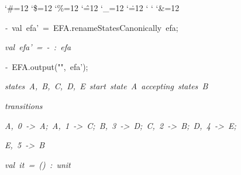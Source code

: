 \begin{list}{}
{\setlength{\leftmargin}{\leftmargini}
\setlength{\rightmargin}{0cm}
\setlength{\itemindent}{0cm}
\setlength{\listparindent}{0cm}
\setlength{\itemsep}{0cm}
\setlength{\parsep}{0cm}
\setlength{\labelsep}{0cm}
\setlength{\labelwidth}{0cm}
\catcode`\#=12
\catcode`\$=12
\catcode`\%=12
\catcode`\^=12
\catcode`\_=12
\catcode`\.=12
\catcode`
\catcode`
\catcode`\&=12
\ttfamily}
\small
\item[]\textsl{-\ }val\ efa'\ =\ EFA.renameStatesCanonically\ efa;
\item[]\textsl{val\ efa'\ =\ -\ :\ efa}
\item[]\textsl{-\ }EFA.output("",\ efa');
\item[]\textsl{states\ A,\ B,\ C,\ D,\ E\ start\ state\ A\ accepting\ states\ B}
\item[]\textsl{transitions}
\item[]\textsl{A,\ 0\ ->\ A;\ A,\ 1\ ->\ C;\ B,\ 3\ ->\ D;\ C,\ 2\ ->\ B;\ D,\ 4\ ->\ E;}
\item[]\textsl{E,\ 5\ ->\ B}
\item[]\textsl{val\ it\ =\ ()\ :\ unit}
\end{list}
